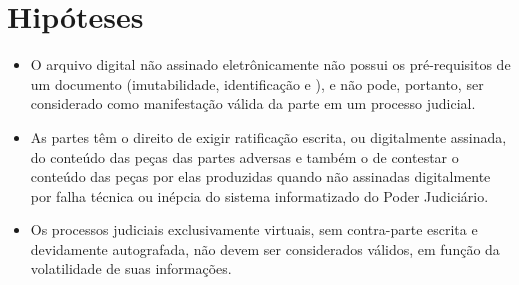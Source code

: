 \chapter{Hipóteses}
\begin{itemize}
    \item O arquivo digital não assinado eletrônicamente não possui os pré-requisitos de um documento (imutabilidade, identificação e ), e não pode, portanto, ser considerado como manifestação válida da parte em um processo judicial.
    \item As partes têm o direito de exigir ratificação escrita, ou digitalmente assinada, do conteúdo das peças das partes adversas e também o de contestar o conteúdo das peças por elas produzidas quando não assinadas digitalmente por falha técnica ou inépcia do sistema informatizado do Poder Judiciário.
    \item Os processos judiciais exclusivamente virtuais, sem contra-parte escrita e devidamente autografada, não devem ser considerados válidos, em função da volatilidade de suas informações.
\end{itemize}
